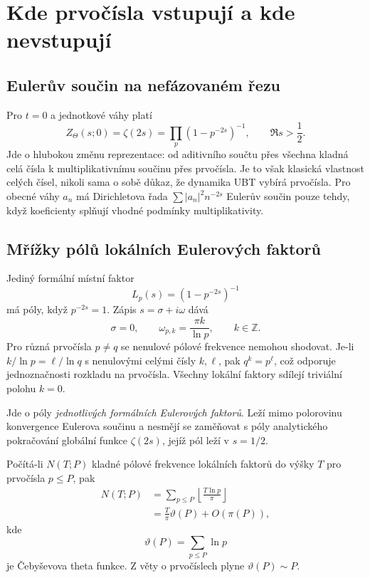 \section{Kde prvočísla vstupují a kde nevstupují}

\subsection{Eulerův součin na nefázovaném řezu}

Pro $t=0$ a jednotkové váhy platí
\begin{equation}
 Z_\Theta(s;0)=\zeta(2s)
 =\prod_{p}\left(1-p^{-2s}\right)^{-1},
 \qquad \Re s>\frac12.
 \label{eq:zeta-euler-product}
\end{equation}
Jde o hlubokou změnu reprezentace: od aditivního součtu přes všechna kladná
celá čísla k multiplikativnímu součinu přes prvočísla. Je to však klasická
vlastnost celých čísel, nikoli sama o sobě důkaz, že dynamika UBT vybírá
prvočísla. Pro obecné váhy $a_n$ má Dirichletova řada
$\sum |a_n|^2n^{-2s}$ Eulerův součin pouze tehdy, když koeficienty splňují
vhodné podmínky multiplikativity.

\subsection{Mřížky pólů lokálních Eulerových faktorů}

Jediný formální místní faktor
\begin{equation}
 L_p(s)=\left(1-p^{-2s}\right)^{-1}
\end{equation}
má póly, když $p^{-2s}=1$.  Zápis $s=\sigma+i\omega$ dává
\begin{equation}
 \sigma=0,
 \qquad
 \omega_{p,k}=\frac{\pi k}{\ln p},
 \qquad k\in\mathbb Z.
 \label{eq:local-prime-poles}
\end{equation}
Pro různá prvočísla $p\neq q$ se nenulové pólové frekvence nemohou shodovat. Je-li
$k/\ln p=\ell/\ln q$ s nenulovými celými čísly $k,\ell$, pak
$q^k=p^\ell$, což odporuje jednoznačnosti rozkladu na prvočísla. Všechny
lokální faktory sdílejí triviální polohu $k=0$.

Jde o póly \emph{jednotlivých formálních Eulerových faktorů}. Leží mimo
polorovinu konvergence Eulerova součinu a nesmějí se zaměňovat s póly
analytického pokračování globální funkce $\zeta(2s)$, jejíž pól leží v $s=1/2$.

Počítá-li $N(T;P)$ kladné pólové frekvence lokálních faktorů do výšky $T$ pro
prvočísla $p\le P$, pak
\begin{align}
 N(T;P)
 &=\sum_{p\le P}\left\lfloor\frac{T\ln p}{\pi}\right\rfloor\\
 &=\frac{T}{\pi}\vartheta(P)+O(\pi(P)),
 \label{eq:local-pole-count}
\end{align}
kde
\begin{equation}
 \vartheta(P)=\sum_{p\le P}\ln p
\end{equation}
je Čebyševova theta funkce. Z věty o prvočíslech plyne
$\vartheta(P)\sim P$.

